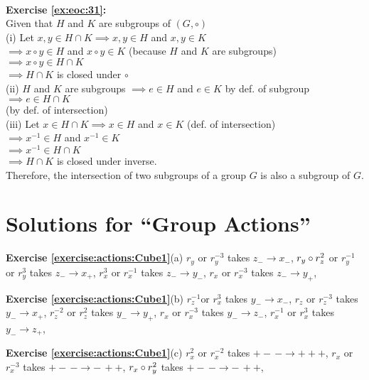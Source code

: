 \\
\textbf{Exercise \ref{ex:eoc:31}:}\\
Given that $H$ and $K$ are subgroups of $(G,\circ)$\\
(i) Let $x,y\in H\cap K \implies x,y\in H$ and $x,y\in K$\\
$\implies x\circ y\in H$ and $x\circ y\in K$ (because $H$ and $K$ are subgroups)\\
$\implies x\circ y\in H\cap K$\\
$\implies H\cap K$ is closed under $\circ$\\
(ii) $H$ and $K$ are subgroups $\implies e\in H$ and $e\in K$ by def. of subgroup\\
$\implies e\in H\cap K$\\ (by def. of intersection)\\
(iii) Let $x\in H\cap K \implies x\in H$ and $x\in K$ (def. of intersection)\\
$\implies x^{-1}\in H$ and $x^{-1}\in K$\\
$\implies x^{-1}\in H\cap K$\\
$\implies H\cap K$ is closed under inverse.\\
Therefore, the intersection of two subgroups of a group $G$ is also a subgroup of $G$.\\

\section{Solutions for ``Group Actions''}
\noindent{}\bigskip

\noindent\textbf{Exercise \ref{exercise:actions:Cube1}}(a)
$r_y$ or $r_y^{-3} $ takes  $z_-\rightarrow x_-$, $r_y\circ r_z^2$ or  $r_y^{-1}$ or $r_y^3$ takes $z_-\rightarrow x_+$, $r_x^3$ or $r_x^{-1}$ takes $z_-\rightarrow y_-$, $r_x$ or $r_x^{-3}$ takes $z_-\rightarrow y_+$,

\noindent\textbf{Exercise \ref{exercise:actions:Cube1}}(b)
$r_z^{-1}$or $r_x^{3}$ takes $y_-\rightarrow x_-$, $r_z$ or $r_z^{-3}$ takes $y_-\rightarrow x_+$, $r_z^{-2}$ or $r_z^{2}$ takes $y_-\rightarrow y_+$, $r_x$ or $r_x^{-3}$ takes $y_-\rightarrow z_-$, $r_x^{-1}$ or $r_x^{3}$ takes $y_-\rightarrow z_+$,

\noindent\textbf{Exercise \ref{exercise:actions:Cube1}}(c)
$r_x^2$ or $r_x^{-2}$ takes $+-\,-\rightarrow +++$,
$r_x$ or $r_x^{-3}$ takes $+-\,-\rightarrow -\,++$, 
$r_x\circ r_y^2$ takes $+-\,-\rightarrow -\,++$, 

